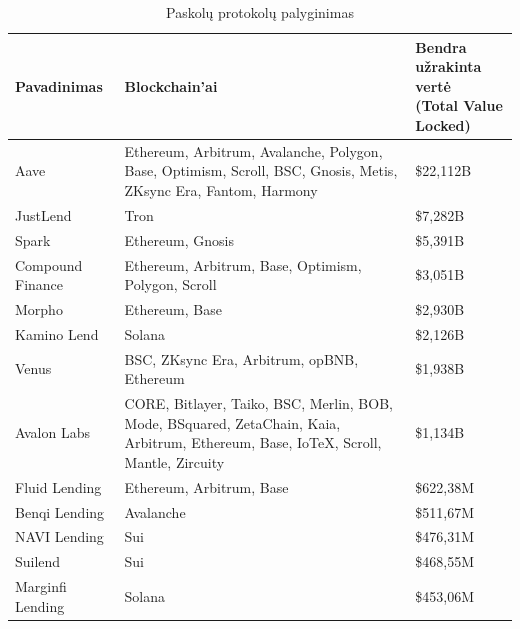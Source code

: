 \documentclass{VUMIFPSkursinis}
\begin{document}
\begin{table}[H]
  \centering
  \caption{Paskolų protokolų palyginimas \cite{LikvidacijuProtokolai}}
  \begin{tabular}{|l|p{7cm}|p{5cm}|}
  \hline
  \textbf{Pavadinimas}       & \textbf{Blockchain'ai}                                                                 & \makecell{\textbf{Bendra užrakinta vertė} \\ \textbf{(Total Value Locked)}} \\ \hline
  Aave                      & Ethereum, Arbitrum, Avalanche, Polygon, Base, Optimism, Scroll, BSC, Gnosis, Metis, ZKsync Era, Fantom, Harmony & \$22,112B \\ \hline
  JustLend                  & Tron                                                                                  & \$7,282B  \\ \hline
  Spark                     & Ethereum, Gnosis                                                                      & \$5,391B  \\ \hline
  Compound Finance          & Ethereum, Arbitrum, Base, Optimism, Polygon, Scroll                                   & \$3,051B  \\ \hline
  Morpho                    & Ethereum, Base                                                                        & \$2,930B  \\ \hline
  Kamino Lend               & Solana                                                                                & \$2,126B  \\ \hline
  Venus                     & BSC, ZKsync Era, Arbitrum, opBNB, Ethereum                                            & \$1,938B  \\ \hline
  Avalon Labs               & CORE, Bitlayer, Taiko, BSC, Merlin, BOB, Mode, BSquared, ZetaChain, Kaia, Arbitrum, Ethereum, Base, IoTeX, Scroll, Mantle, Zircuity & \$1,134B  \\ \hline
  Fluid Lending             & Ethereum, Arbitrum, Base                                                              & \$622,38M \\ \hline
  Benqi Lending             & Avalanche                                                                             & \$511,67M \\ \hline
  NAVI Lending              & Sui                                                                                   & \$476,31M \\ \hline
  Suilend                   & Sui                                                                                   & \$468,55M \\ \hline
  Marginfi Lending          & Solana                                                                                & \$453,06M \\ \hline
  \end{tabular}
  \label{tab:sample_table}
\end{table}
\end{document}
